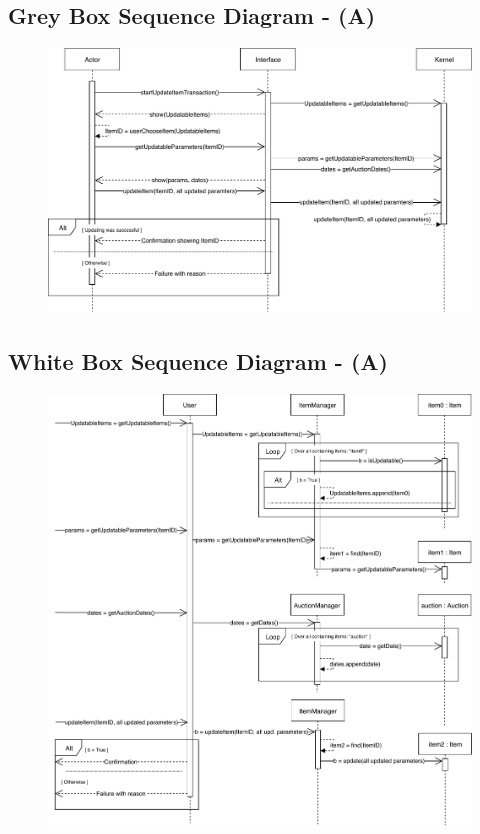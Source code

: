 \subsection*{Grey Box Sequence Diagram - (A)}
\begin{figure}[H]
	\centering
	\includegraphics[scale=.9]{uml/SD-gb-update.pdf}
\end{figure}
\subsection*{White Box Sequence Diagram - (A)}
\begin{figure}[H]
	\centering
	\includegraphics[scale=.85]{uml/SD-wb-update.pdf}
\end{figure}